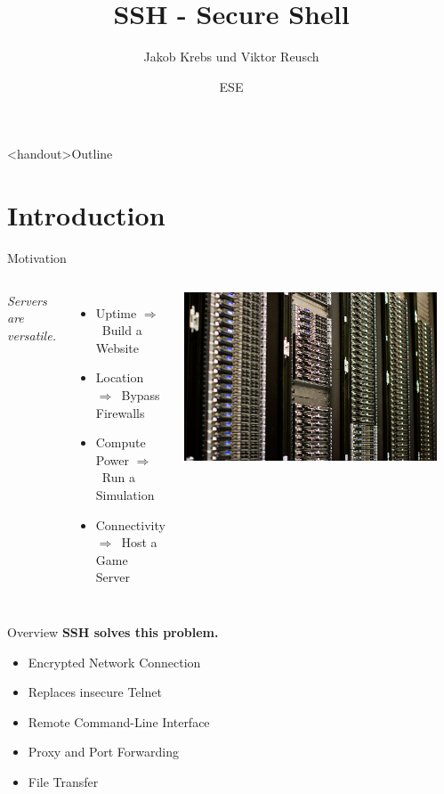 \documentclass[10pt, graphics, aspectratio=169, table]{beamer}
\title{SSH - Secure Shell}
\author{Jakob Krebs und Viktor Reusch}
\date{ESE \the\year{}}
\institute{Nerd::101 - ESE - ifsr - TU Dresden}
\newcommand{\ra}{$\Rightarrow$\ }
\begin{document}
\maketitle

\begin{frame}<handout>{Outline}
	\tableofcontents
\end{frame}

\section{Introduction}
\begin{frame}{Motivation}
\begin{columns}
		\emph{Servers are versatile.}
		\begin{itemize}
			\item Uptime \ra Build a Website
			\item Location \ra Bypass Firewalls
			\item Compute Power \ra Run a Simulation
			\item Connectivity \ra Host a Game Server
		\end{itemize}
		\includegraphics[width=\textwidth]{img/servers.jpg}

		\hfill \cite{servers}
\end{columns}
\end{frame}

\begin{frame}{Overview}
	\textbf{SSH solves this problem.}
	\begin{itemize}
		\item Encrypted Network Connection
		\item Replaces insecure Telnet
		\item Remote Command-Line Interface
		\item Proxy and Port Forwarding
		\item File Transfer
	\end{itemize}
\end{frame}
\end{document}
